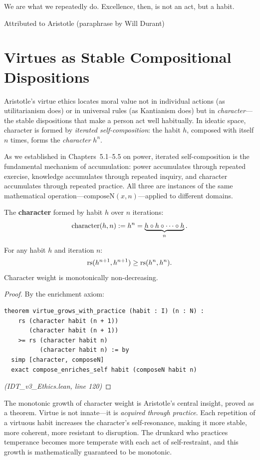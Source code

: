 \epigraph{We are what we repeatedly do. Excellence, then, is not an act, but a habit.}{Attributed to Aristotle (paraphrase by Will Durant)}

\section{Virtues as Stable Compositional Dispositions}

Aristotle's virtue ethics locates moral value not in individual actions
(as utilitarianism does) or in universal rules (as Kantianism does) but in
\emph{character}---the stable dispositions that make a person act well
habitually. In ideatic space, character is formed by \emph{iterated
self-composition}: the habit $h$, composed with itself $n$ times, forms the
\emph{character} $h^n$.

As we established in Chapters~5.1--5.5 on power, iterated self-composition
is the fundamental mechanism of accumulation: power accumulates through
repeated exercise, knowledge accumulates through repeated inquiry, and
character accumulates through repeated practice. All three are instances of
the same mathematical operation---$\mathrm{composeN}(x, n)$---applied to
different domains.

\begin{definition}[Character]
\label{def:character}
The \textbf{character} formed by habit $h$ over $n$ iterations:
\[
  \mathrm{character}(h, n) := h^n = \underbrace{h \circ h \circ \cdots \circ h}_{n}.
\]
\end{definition}

\begin{theorem}
\label{thm:virtue-grows}
For any habit $h$ and iteration $n$:
\[
  \mathrm{rs}(h^{n+1}, h^{n+1}) \geq \mathrm{rs}(h^n, h^n).
\]
Character weight is monotonically non-decreasing.
\end{theorem}

\begin{proof}
By the enrichment axiom:
\begin{lstlisting}
theorem virtue_grows_with_practice (habit : I) (n : N) :
    rs (character habit (n + 1))
       (character habit (n + 1))
    >= rs (character habit n)
          (character habit n) := by
  simp [character, composeN]
  exact compose_enriches_self habit (composeN habit n)
\end{lstlisting}
\textit{(IDT\_v3\_Ethics.lean, line 120)}
\end{proof}

\begin{interpretation}
The monotonic growth of character weight is Aristotle's central insight,
proved as a theorem. Virtue is not innate---it is \emph{acquired through
practice}. Each repetition of a virtuous habit increases the character's
self-resonance, making it more stable, more coherent, more resistant to
disruption. The drunkard who practices temperance becomes more temperate
with each act of self-restraint, and this growth is mathematically guaranteed
to be monotonic.
\end{interpretation}

